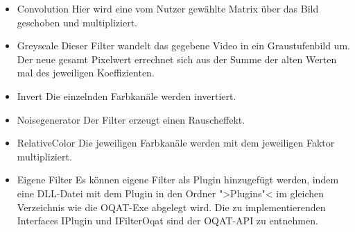 \begin{itemize}
\item Convolution \newline
Hier wird eine vom Nutzer gewählte Matrix über das Bild geschoben und multipliziert.
\item Greyscale \newline
Dieser Filter wandelt das gegebene Video in ein Graustufenbild um. 
Der neue gesamt Pixelwert errechnet sich aus  der Summe der alten Werten mal des jeweiligen Koeffizienten.
\item Invert \newline
Die einzelnden Farbkanäle werden invertiert.
\item Noisegenerator \newline
Der Filter erzeugt einen Rauscheffekt.
\item RelativeColor \newline
Die jeweiligen Farbkanäle werden mit dem jeweiligen Faktor multipliziert.
\item Eigene Filter \newline
Es können eigene Filter als Plugin hinzugefügt werden, indem eine DLL-Datei mit dem Plugin in den Ordner ">Plugins"< im gleichen Verzeichnis wie die OQAT-Exe abgelegt wird. Die zu implementierenden Interfaces IPlugin und IFilterOqat sind der OQAT-API zu entnehmen.
\end{itemize}


